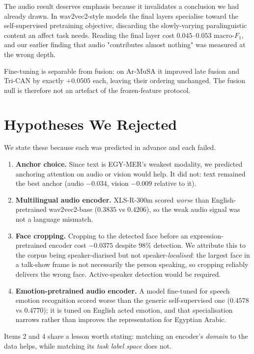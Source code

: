\documentclass[12pt, a4paper]{article}
\begin{document}
The audio result deserves emphasis because it invalidates a conclusion we had
already drawn. In wav2vec2-style models the final layers specialise toward the
self-supervised pretraining objective, discarding the slowly-varying
paralinguistic content an affect task needs. Reading the final layer cost
$0.045$--$0.053$ macro-$F_1$, and our earlier finding that audio "contributes
almost nothing" was measured at the wrong depth.

Fine-tuning is separable from fusion: on Ar-MuSA it improved late fusion and
Tri-CAN by exactly $+0.0505$ each, leaving their ordering unchanged. The fusion
null is therefore not an artefact of the frozen-feature protocol.

\section{Hypotheses We Rejected}
\label{sec:falsified}

We state these because each was predicted in advance and each failed.

\begin{enumerate}
\item \textbf{Anchor choice.} Since text is EGY-MER's weakest modality, we
predicted anchoring attention on audio or vision would help. It did not: text
remained the best anchor (audio $-0.034$, vision $-0.009$ relative to it).
\item \textbf{Multilingual audio encoder.} XLS-R-300m scored \emph{worse} than
English-pretrained wav2vec2-base ($0.3835$ vs $0.4206$), so the weak audio
signal was not a language mismatch.
\item \textbf{Face cropping.} Cropping to the detected face before an
expression-pretrained encoder cost $-0.0375$ despite 98\% detection. We
attribute this to the corpus being speaker-diarised but not
speaker-\emph{localised}: the largest face in a talk-show frame is not
necessarily the person speaking, so cropping reliably delivers the wrong face.
Active-speaker detection would be required.
\item \textbf{Emotion-pretrained audio encoder.} A model fine-tuned for speech
emotion recognition scored worse than the generic self-supervised one
($0.4578$ vs $0.4770$); it is tuned on English acted emotion, and that
specialisation narrows rather than improves the representation for Egyptian
Arabic.
\end{enumerate}

Items 2 and 4 share a lesson worth stating: matching an encoder's \emph{domain}
to the data helps, while matching its \emph{task label space} does not.
\end{document}
